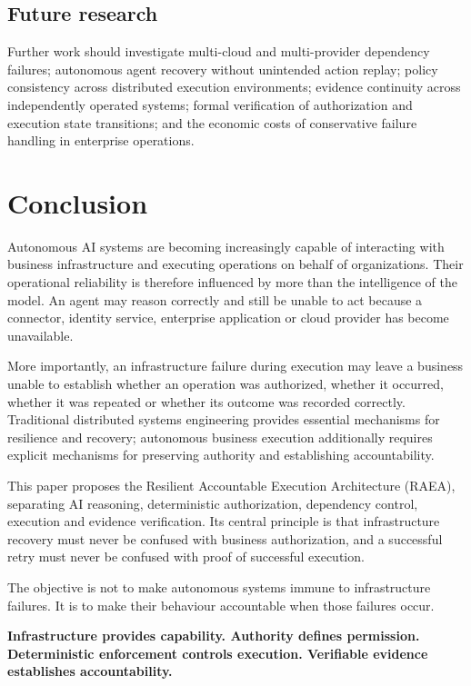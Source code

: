 \documentclass[11pt,a4paper]{article}
\newcommand{\RAEA}{Resilient Accountable Execution Architecture (RAEA)}
\begin{document}
\subsection{Future research}
Further work should investigate multi-cloud and multi-provider dependency failures; autonomous agent recovery without unintended action replay; policy consistency across distributed execution environments; evidence continuity across independently operated systems; formal verification of authorization and execution state transitions; and the economic costs of conservative failure handling in enterprise operations.

\section{Conclusion}

Autonomous AI systems are becoming increasingly capable of interacting with business infrastructure and executing operations on behalf of organizations. Their operational reliability is therefore influenced by more than the intelligence of the model. An agent may reason correctly and still be unable to act because a connector, identity service, enterprise application or cloud provider has become unavailable.

More importantly, an infrastructure failure during execution may leave a business unable to establish whether an operation was authorized, whether it occurred, whether it was repeated or whether its outcome was recorded correctly. Traditional distributed systems engineering provides essential mechanisms for resilience and recovery; autonomous business execution additionally requires explicit mechanisms for preserving authority and establishing accountability.

This paper proposes the \RAEA{}, separating AI reasoning, deterministic authorization, dependency control, execution and evidence verification. Its central principle is that infrastructure recovery must never be confused with business authorization, and a successful retry must never be confused with proof of successful execution.

The objective is not to make autonomous systems immune to infrastructure failures. It is to make their behaviour accountable when those failures occur.

\begin{center}
\textbf{Infrastructure provides capability. Authority defines permission. Deterministic enforcement controls execution. Verifiable evidence establishes accountability.}
\end{center}
\end{document}
